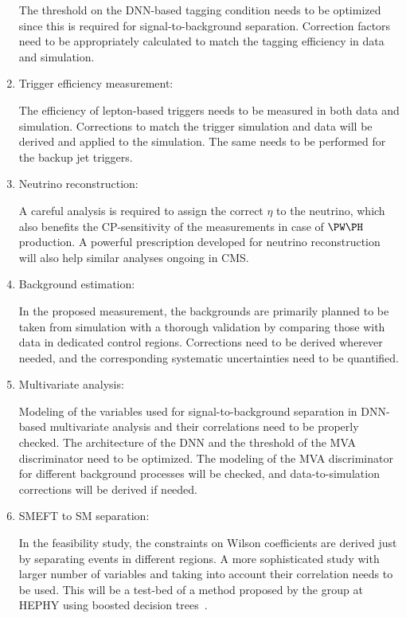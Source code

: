 \documentclass[a4paper,11pt]{article}
\begin{document}
\begin{enumerate}
The threshold on the DNN-based \PH tagging condition needs to be optimized since this is required for signal-to-background separation. 
Correction factors need to be appropriately calculated to match the tagging efficiency in data and simulation.

\item Trigger efficiency measurement:

The efficiency of lepton-based triggers needs to be measured in both data and simulation. 
Corrections to match the trigger simulation and data will be derived and applied to the simulation. 
The same needs to be performed for the backup jet triggers. 

\item Neutrino reconstruction:

A careful analysis is required to assign the correct $\eta$ to the neutrino, which also benefits the CP-sensitivity of the measurements in case of $\PW\PH$ production. 
A powerful prescription developed for neutrino reconstruction will also help similar analyses ongoing in CMS. 

\item Background estimation:

In the proposed measurement, the backgrounds are primarily planned to be taken from simulation with a thorough validation by comparing those with data in dedicated control regions. 
Corrections need to be derived wherever needed, and the corresponding systematic uncertainties need to be quantified.   

\item Multivariate analysis: 

Modeling of the variables used for signal-to-background separation in DNN-based multivariate analysis and their correlations need to be properly checked. 
The architecture of the DNN and the threshold of the MVA discriminator need to be optimized. 
The modeling of the MVA discriminator for different background processes will be checked, 
and data-to-simulation corrections will be derived if needed. 

\item SMEFT to SM separation: 

In the feasibility study, the constraints on Wilson coefficients are derived just by separating events in different regions. A more sophisticated study with larger number of variables and taking into account their correlation needs to be used. 
This will be a test-bed of a method proposed by the group at HEPHY using boosted decision trees~\cite{Chatterjee:2021nms}. 


\end{enumerate}
\end{document}
